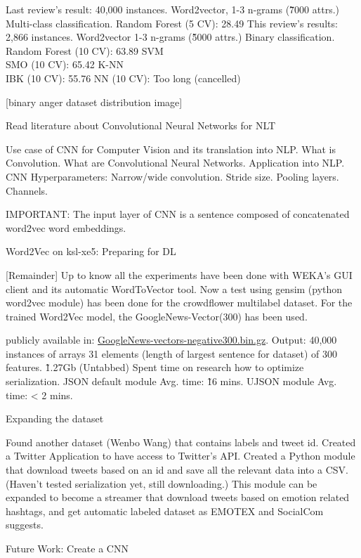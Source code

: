 Last review’s result:
40,000 instances.
Word2vector, 1-3 n-grams\cite{cavnar1994n} (\~7000 attrs.)
Multi-class classification.
Random Forest (5 CV): 28.49%
This review’s results:
2,866 instances.
Word2vector 1-3 n-grams (\~5000 attrs.)
Binary classification.
Random Forest (10 CV): 63.89%
SVM\\SMO (10 CV): 65.42%
K-NN\\IBK (10 CV): 55.76%
NN (10 CV): Too long (cancelled)

[binary anger dataset distribution image]

Read literature about Convolutional Neural Networks for NLT\cite{cnnDennyBritz}

Use case of CNN for Computer Vision and its translation into NLP.
What is Convolution.
What are Convolutional Neural Networks.
Application into NLP.
CNN Hyperparameters:
Narrow/wide convolution.
Stride size.
Pooling layers.
Channels.

IMPORTANT: The input layer of CNN is a sentence composed of concatenated word2vec word embeddings.

Word2Vec on ksl-xe5: Preparing for DL

[Remainder] Up to know all the experiments have been done with WEKA’s GUI client and its automatic WordToVector tool.
Now a test using gensim (python word2vec module) has been done for the crowdflower multilabel dataset.
For the trained Word2Vec model, the GoogleNews-Vector(300)\cite{googleWord2Vec} has been used.

publicly available in: \href{https://drive.google.com/file/d/0B7XkCwpI5KDYNlNUTTlSS21pQmM/edit?usp=sharing}{GoogleNews-vectors-negative300.bin.gz}.
Output: 40,000 instances of arrays 31 elements (length of largest sentence for dataset) of 300 features. \~1.27Gb (Untabbed)
Spent time on research how to optimize serialization.
JSON default module Avg. time: \~ 16 mins.
UJSON module Avg. time: < 2 mins.

Expanding the dataset

Found another dataset (Wenbo Wang) that contains labels and tweet id.
Created a Twitter Application to have access to Twitter’s API.
Created a Python module that download tweets based on an id and save all the relevant data into a CSV. (Haven’t tested serialization yet, still downloading.)
This module can be expanded to become a streamer that download tweets based on emotion related hashtags, and get automatic labeled dataset as EMOTEX and SocialCom suggests.

Future Work: Create a CNN

